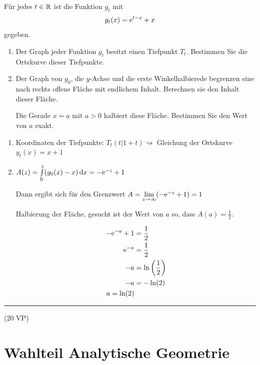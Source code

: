 \aufgabe{}
Für jedes $t\in \mathbb{R}$ ist die Funktion $g_t$ mit
\begin{equation*}
	g_t(x)=\mathrm{e}^{t-x}+x
\end{equation*}
gegeben.
\begin{enumerate}
	\item Der Graph jeder Funktion $g_t$ besitzt einen Tiefpunkt $T_t$. Bestimmen Sie die Ortskurve dieser Tiefpunkte. 
	\item Der Graph von $g_0$, die $y$-Achse und die erste Winkelhalbierede begrenzen eine nach rechts offene Fläche mit endlichem Inhalt. Berechnen sie den Inhalt dieser Fläche.

	Die Gerade $x=a$ mit $a>0$ halbiert diese Fläche. Bestimmen Sie den Wert von $a$ exakt. 
\end{enumerate}
\begin{lsg}{}
	\begin{enumerate}
		\item Koordinaten der Tiefpunkte: $T_t(t|1+t) \rightsquigarrow$ Gleichung der Ortskurve $y_t(x)=x+1$
		\item $A(z)=\int\limits_0^z(g_0(x)-x)\,\mathrm{d} x=-\mathrm{e}^{-z}+1$

		Dann ergibt sich für den Grenzwert $A=\lim\limits_{z\rightarrow \infty} (-\mathrm{e}^{-z}+1)=1$

		Halbierung der Fläche, gesucht ist der Wert von $a$ so, dass $A(a)=\frac 1 2$.

		\begin{align*}
			-\mathrm{e}^{-a}+1 &= \frac 1 2\\
			\mathrm{e}^{-a} &= \frac 1 2\\
			-a &= \ln\left(\frac 1 2\right)\\
			-a &= -\ln(2)\\
			a = \ln(2)
		\end{align*}
	\end{enumerate}
\end{lsg}






\vfill

\hfill\rule{1.5cm}{0.4mm}

\hfill (20 VP)\hspace{0.22cm}





\section{Wahlteil Analytische Geometrie}

